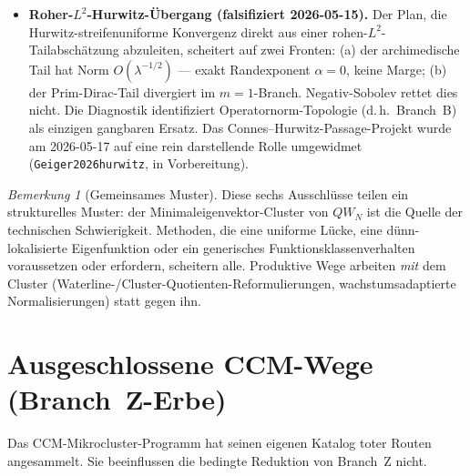 \documentclass[12pt,a4paper]{article}
\theoremstyle{definition}
\theoremstyle{remark}
\newtheorem{remark}[theorem]{Bemerkung}
\begin{document}
\begin{itemize}
  \item \textbf{Roher-$L^2$-Hurwitz-Übergang (falsifiziert 2026-05-15).}
    Der Plan, die Hurwitz-streifenuniforme Konvergenz direkt aus einer
    rohen-$L^2$-Tailabschätzung abzuleiten, scheitert auf zwei Fronten:
    (a) der archimedische Tail hat Norm $O(\lambda^{-1/2})$ --- exakt
    Randexponent $\alpha=0$, keine Marge; (b) der Prim-Dirac-Tail
    divergiert im $m=1$-Branch. Negativ-Sobolev rettet dies nicht. Die
    Diagnostik identifiziert Operatornorm-Topologie (d.\,h.\ Branch~B)
    als einzigen gangbaren Ersatz. Das Connes--Hurwitz-Passage-Projekt
    wurde am 2026-05-17 auf eine rein darstellende Rolle umgewidmet
    (\texttt{Geiger2026hurwitz}, in Vorbereitung).
\end{itemize}

\begin{remark}[Gemeinsames Muster]
\label{rem:spectral-pattern}
Diese sechs Ausschlüsse teilen ein strukturelles Muster: der
Minimaleigenvektor-Cluster von $QW_N$ ist die Quelle der technischen
Schwierigkeit. Methoden, die eine uniforme Lücke, eine
dünn-lokalisierte Eigenfunktion oder ein generisches
Funktionsklassenverhalten voraussetzen oder erfordern, scheitern alle.
Produktive Wege arbeiten \emph{mit} dem Cluster (Waterline-/Cluster-Quotienten-Reformulierungen, wachstumsadaptierte Normalisierungen) statt gegen ihn.
\end{remark}


\section{Ausgeschlossene CCM-Wege (Branch~Z-Erbe)}
\label{sec:excluded-ccm}

Das CCM-Mikrocluster-Programm hat seinen eigenen Katalog toter Routen
angesammelt. Sie beeinflussen die bedingte Reduktion von Branch~Z nicht.
\end{document}
